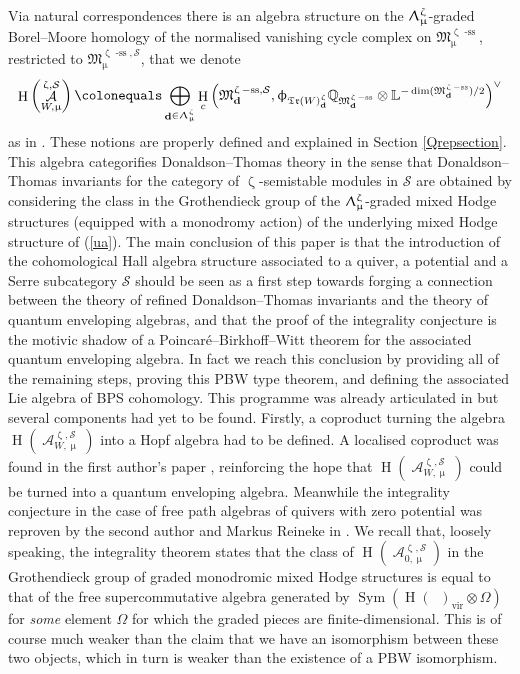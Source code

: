 \documentclass[a4paper,10pt]{amsart}
\renewcommand{\zeta}{\upzeta}
\renewcommand{\Lambda}{\Uplambda}
\renewcommand{\phi}{\upphi}
\renewcommand{\mu}{\upmu}
\DeclareMathOperator{\BC}{B\mathbb{C}^*}
\newcommand{\LL}{\mathbb{L}}
\newcommand{\QQ}{\mathbb{Q}}
\newcommand{\SP}{\mathcal{S}}
\newcommand{\WWW}{\mathfrak{Tr}(W)}
\newcommand{\Mst}{\mathfrak{M}}
\DeclareMathOperator{\sst}{-ss}
\DeclareMathOperator{\dd}{\mathbf{d}}
\DeclareMathOperator{\Sym}{Sym}
\DeclareMathOperator{\vir}{vir}
\DeclareMathOperator{\HO}{H}
\DeclareMathOperator{\Coha}{\mathcal{A}}
\begin{document}
\smallbreak
Via natural correspondences there is an algebra structure on the $\Lambda_{\mu}^{\zeta}$-graded Borel--Moore homology of the normalised vanishing cycle complex on $\Mst^{\zeta\sst}_{\mu}$, restricted to $\Mst^{\zeta\sst,\SP}_{\mu}$, that we denote 
\begin{equation}
\label{ua}
\HO\left(\Coha_{W,\mu}^{\zeta,\SP}\right)\colonequals  \bigoplus_{\dd\in\Lambda_{\mu}^{\zeta}}\HO_{c}\left(\Mst^{\zeta\sst,\SP}_{\dd},\phi_{\WWW^{\zeta}_{\dd}}\QQ_{\Mst^{\zeta\sst}_{\dd}}\otimes\LL^{-\dim(\Mst^{\zeta\sst}_{\dd})/2}\right)^{\vee}
\end{equation}
as in \cite{KS2}.  These notions are properly defined and explained in Section \ref{Qrepsection}.  This algebra categorifies Donaldson--Thomas theory in the sense that Donaldson--Thomas invariants for the category of $\zeta$-semistable modules in $\mathcal{S}$ are obtained by considering the class in the Grothendieck group of the $\Lambda_{\mu}^{\zeta}$-graded mixed Hodge structures (equipped with a monodromy action) of the underlying mixed Hodge structure of (\ref{ua}).
\smallbreak 
The main conclusion of this paper is that the introduction of the cohomological Hall algebra structure associated to a quiver, a potential and a Serre subcategory $\mathcal{S}$ should be seen as a first step towards forging a connection between the theory of refined Donaldson--Thomas invariants and the theory of quantum enveloping algebras, and that the proof of the integrality conjecture is the motivic shadow of a Poincar\'e--Birkhoff--Witt theorem for the associated quantum enveloping algebra.  In fact we reach this conclusion by providing all of the remaining steps, proving this PBW type theorem, and defining the associated Lie algebra of BPS cohomology.  This programme was already articulated in \cite{KS2} but several components had yet to be found.  
\smallbreak
Firstly, a coproduct turning the algebra $\HO(\Coha_{W,\mu}^{\zeta,\SP})$ into a Hopf algebra had to be defined.  A localised coproduct was found in the first author's paper \cite{Da13}, reinforcing the hope that $\HO(\Coha_{W,\mu}^{\zeta,\SP})$ could be turned into a quantum enveloping algebra.  Meanwhile the integrality conjecture in the case of free path algebras of quivers with zero potential was reproven by the second author and Markus Reineke in \cite{Meinhardt14}.  We recall that, loosely speaking, the integrality theorem states that the class of $\HO(\Coha_{0,\mu}^{\zeta,\SP})$ in the Grothendieck group of graded monodromic mixed Hodge structures is equal to that of the free supercommutative algebra generated by $\Sym\left(\HO(\BC)_{\vir}\otimes\Omega\right)$ for \textit{some} element $\Omega$ for which the graded pieces are finite-dimensional.  This is of course much weaker than the claim that we have an isomorphism between these two objects, which in turn is weaker than the existence of a PBW isomorphism.  
\end{document}
